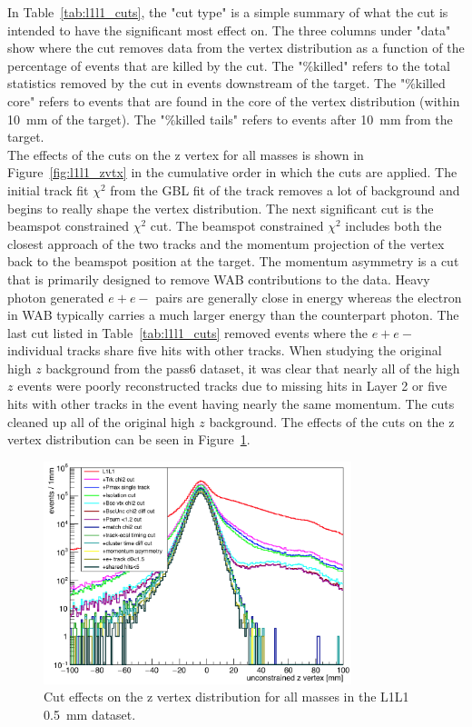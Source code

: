 In Table~\ref{tab:l1l1_cuts}, the "cut type" is a simple summary of what the cut is intended to have the significant most effect on. The three columns under "data" show where the cut removes data from the vertex distribution as a function of the percentage of events that are killed by the cut. The "$\%$killed" refers to the total statistics removed by the cut in events downstream of the target. The "$\%$killed core" refers to events that are found in the core of the vertex distribution (within 10~mm of the target). The "$\%$killed tails" refers to events after 10~mm from the target. \\
\indent The effects of the cuts on the z vertex for all masses is shown in Figure~\ref{fig:l1l1_zvtx} in the cumulative order in which the cuts are applied. The initial track fit $\chi^{2}$ from the GBL fit of the track removes a lot of background and begins to really shape the vertex distribution. The next significant cut is the beamspot constrained $\chi^{2}$ cut. The beamspot constrained $\chi^{2}$ includes both the closest approach of the two tracks and the momentum projection of the vertex back to the beamspot position at the target. The momentum asymmetry is a cut that is primarily designed to remove WAB contributions to the data. Heavy photon generated $e+e-$ pairs are generally close in energy whereas the electron in WAB typically carries a much larger energy than the counterpart photon. 
\indent The last cut listed in Table~\ref{tab:l1l1_cuts} removed events where the $e+e-$ individual tracks share five hits with other tracks. When studying the original high $z$ background from the pass6 dataset, it was clear that nearly all of the high $z$ events were poorly reconstructed tracks due to missing hits in Layer 2 or five hits with other tracks in the event having nearly the same momentum. The cuts cleaned up all of the original high $z$ background. The effects of the cuts on the z vertex distribution can be seen in Figure~\ref{fig:l1l1_vtx}.

\begin{figure}[H]
  \centering
      \includegraphics[width=0.8\textwidth]{pics/searching/L1L1_zvtx.png}
  \caption{Cut effects on the z vertex distribution for all masses in the L1L1 0.5~mm dataset.}
  \label{fig:l1l1_vtx}
\end{figure} 

